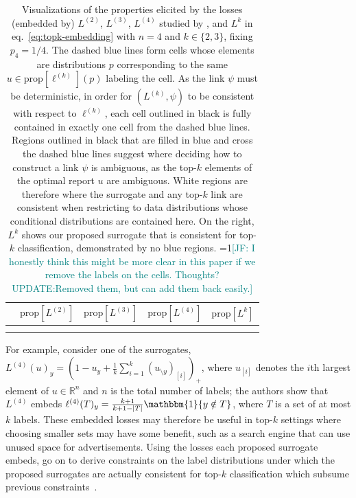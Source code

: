 \documentclass[11pt]{article}
\newcommand{\Comments}{1}
\newcommand{\mynote}[2]{\ifnum\Comments=1\textcolor{#1}{#2}\fi}
\newcommand{\jessie}[1]{\mynote{teal}{[JF: #1]}}
\newcommand{\reals}{\mathbb{R}}
\newcommand{\prop}[1]{\mathrm{prop}[#1]}
\newcommand{\Li}[1]{L^{(#1)}}
\newcommand{\elli}[1]{\ell^{(#1)}}
\newcommand{\ones}{\mathbbm{1}}
\begin{document}
\begin{table}
	\centering
	\begin{tabular}{ccccc}
		& $\prop{\Li{2}}$ & $\prop{\Li{3}}$ & $\prop{\Li{4}}$ & $\prop{L^k}$\\
		\hline \hline
		\rotatebox[origin=c]{90}{$k = 2$\hspace*{-2.5cm}} &  &  &  & \\ 
		\rotatebox[origin=c]{90}{$k = 3$\hspace*{-2.5cm}} &  &  &  & \\ 
	\end{tabular}
	\caption{
		Visualizations of the properties elicited by the losses (embedded by) $\Li{2}$, $\Li{3}$, $\Li{4}$ studied by \citeauthor{yang2018consistency}, and $L^k$ in eq.~\eqref{eq:topk-embedding} with $n=4$ and $k \in \{2,3\}$, fixing $p_4 = 1/4$. 
		The dashed blue lines form cells whose elements are distributions $p$ corresponding to the same $u \in \prop{\elli k}(p)$ labeling the cell. 
		As the link $\psi$ must be deterministic, in order for $(\Li{k}, \psi)$ to be consistent with respect to $\elli k$, each cell outlined in black is fully contained in exactly one cell from the dashed blue lines. 
		Regions outlined in black that are filled in blue and cross the dashed blue lines suggest where deciding how to construct a link $\psi$ is ambiguous, as the top-$k$ elements of the optimal report $u$ are ambiguous.  
		White regions are therefore where the surrogate and any top-$k$ link are consistent when restricting to data distributions whose conditional distributions are contained here. 
		On the right, $L^k$ shows our proposed surrogate that is consistent for top-$k$ classification, demonstrated by no blue regions.  
		\jessie{I honestly think this might be more clear in this paper if we remove the labels on the cells.  Thoughts?  UPDATE:Removed them, but can add them back easily.}
	}
	\label{tab:loss-slices}
\end{table}

For example, consider one of the surrogates, $\Li {4}(u)_y = \left(1 - u_y + \frac 1 k \sum_{i=1}^k (u_{\setminus y})_{[i]}\right)_+$, where $u_{[i]}$ denotes the $i$th largest element of $u \in \reals^n$ and $n$ is the total number of labels;
the authors show that $\Li{4}$ embeds $\ell^{(4)}(T)_y = \tfrac {k+1} {k+1-|T|} \ones\{y\notin T\}$, where $T$ is a set of at most $k$ labels.
These embedded losses may therefore be useful in top-$k$ settings where choosing smaller sets may have some benefit, such as a search engine that can use unused space for advertisements.
Using the losses each proposed surrogate embeds, \citeauthor{finocchiaro2022consistenttopk} go on to derive constraints on the label distributions under which the proposed surrogates are actually consistent for top-$k$ classification which subsume previous constraints~\citep{yang2018consistency}.
\end{document}
